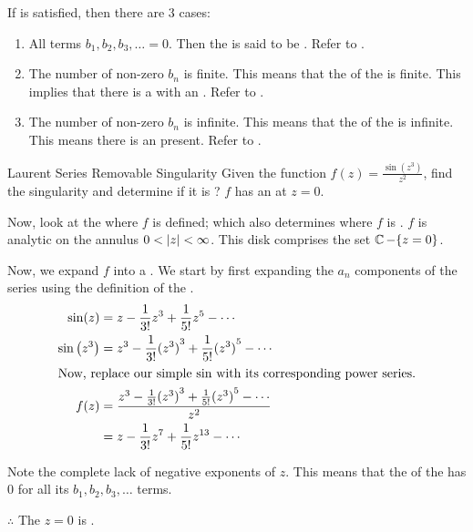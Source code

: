If  is satisfied, then there are 3 cases:
\begin{enumerate}[noitemsep]
\item All terms $b_{1}, b_{2}, b_{3}, \ldots = 0$.
  Then the  is said to be .
  Refer to .
\item The number of non-zero $b_{n}$ is finite.
  This means that the  of the  is finite.
  This implies that there is a  with an .
  Refer to .
\item The number of non-zero $b_{n}$ is infinite.
  This means that the  of the  is infinite.
  This means there is an  present.
  Refer to .
\end{enumerate}

\begin{example}{Laurent Series Removable Singularity}
  Given the function $f(z) = \frac{\sin \left( z^{3} \right)}{z^{2}}$, find the singularity and determine if it is ?
  \tcblower{}
  $f$ has an   at $z=0$.

  Now, look at the  where $f$ is defined; which also determines where $f$ is .
  $f$ is analytic on the annulus $0 < \left\lvert z \right\rvert < \infty$.
  This disk comprises the set $\operatorname{\mathbb{C}} - \lbrace z=0 \rbrace$.

  Now, we expand $f$ into a .
  We start by first expanding the $a_{n}$ components of the series using the definition of the .
  \begin{align*}
    \sin(z) &= z - \frac{1}{3!} z^{3} + \frac{1}{5!} z^{5} - \cdots \\
    \sin \left( z^{3}\right) &= z^{3} - \frac{1}{3!} {(z^{3})}^{3} + \frac{1}{5!} {(z^{3})}^{5} - \cdots \\
    \intertext{Now, replace our simple $\sin$ with its corresponding power series.}
    f(z) &= \frac{z^{3} - \frac{1}{3!} {(z^{3})}^{3} + \frac{1}{5!} {(z^{3})}^{5} - \cdots}{z^{2}} \\
    &= z - \frac{1}{3!} z^{7} + \frac{1}{5!} z^{13} - \cdots
  \end{align*}

  Note the complete lack of negative exponents of $z$.
  This means that the  of the  has $0$ for all its $b_{1}, b_{2}, b_{3}, \ldots$ terms.

  $\therefore$ The  $z=0$ is .
\end{example}

